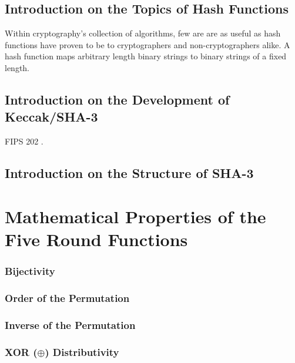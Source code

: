 \documentclass[10pt,twocolumn,twoside]{pnas-new}
\begin{document}
\subsection{Introduction on the Topics of Hash Functions} \label{sec:i:hash}

    Within cryptography's collection of algorithms, few are are as useful as
hash functions have proven to be to cryptographers and non-cryptographers
alike. A hash function maps arbitrary length binary strings to binary strings
of a fixed length.

\subsection{Introduction on the Development of Keccak/SHA-3} \label{sec:i:keccak}

    FIPS 202 \cite{NIST202}.

\subsection{Introduction on the Structure of SHA-3} \label{sec:i:structure}





\section{Mathematical Properties of the Five Round Functions} \label{sec:properties}

\subsubsection{Bijectivity} \label{sec:p:bijectivity}

\subsubsection{Order of the Permutation} \label{sec:p:order}

\subsubsection{Inverse of the Permutation} \label{sec:p:inverse}

\subsubsection{XOR ($\oplus$) Distributivity} \label{sec:p:xor}
\end{document}

